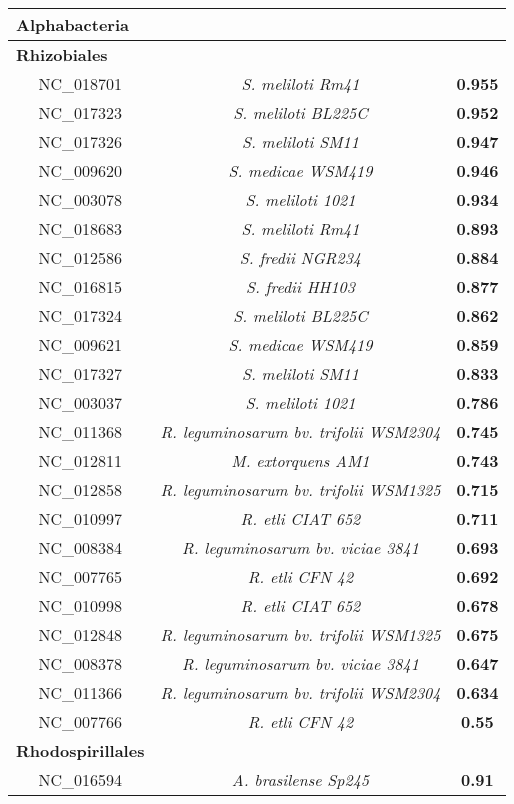\begin{landscape}
\begin{table}
\begin{minipage}[t]{0.5\textwidth}
	  \end{minipage}
	  \hspace{2cm}
	  \begin{minipage}[t]{0.5\textwidth}
	  \centering
	 	  \vspace{-3.5cm}
	  	 \begin{tiny}
	  \begin{tabular}{c>{\itshape}c>{\bfseries}c}
	  \multicolumn{1}{l}{\textbf{Alphabacteria}}\\
\hline
\multicolumn{1}{l}{\textbf{Rhizobiales}}\\
NC\_018701&S. meliloti Rm41&0.955\\
NC\_017323&S. meliloti BL225C&0.952\\
NC\_017326&S. meliloti SM11&0.947\\
NC\_009620&S. medicae WSM419&0.946\\
NC\_003078&S. meliloti 1021&0.934\\
NC\_018683&S. meliloti Rm41&0.893\\
NC\_012586&S. fredii NGR234&0.884\\
NC\_016815&S. fredii HH103&0.877\\
NC\_017324&S. meliloti BL225C&0.862\\
NC\_009621&S. medicae WSM419&0.859\\
NC\_017327&S. meliloti SM11&0.833\\
NC\_003037&S. meliloti 1021&0.786\\
NC\_011368&R. leguminosarum bv. trifolii WSM2304&0.745\\
NC\_012811&M. extorquens AM1&0.743\\
NC\_012858&R. leguminosarum bv. trifolii WSM1325&0.715\\
NC\_010997&R. etli CIAT 652&0.711\\
NC\_008384&R. leguminosarum bv. viciae 3841&0.693\\
NC\_007765&R. etli CFN 42&0.692\\
NC\_010998&R. etli CIAT 652&0.678\\
NC\_012848&R. leguminosarum bv. trifolii WSM1325&0.675\\
NC\_008378&R. leguminosarum bv. viciae 3841&0.647\\
NC\_011366&R. leguminosarum bv. trifolii WSM2304&0.634\\
NC\_007766&R. etli CFN 42&0.55\\
\multicolumn{1}{l}{\textbf{Rhodospirillales}}\\
NC\_016594&A. brasilense Sp245&0.91\\

\end{tabular}
\end{tiny}
\end{minipage}
\end{table}
\end{landscape}
